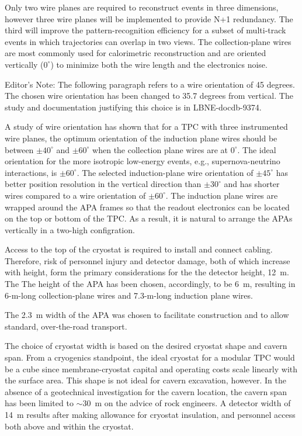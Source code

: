 Only two wire planes are required to reconstruct events in three dimensions, however three wire planes will be implemented to provide N+1 redundancy. The third will improve the pattern-recognition efficiency for a subset of multi-track events in which trajectories can overlap in two views. The collection-plane wires are most commonly used for calorimetric reconstruction and are oriented vertically ($0^\circ$) to minimize both the wire length and the electronics noise.

\begin{editornote}
  Editor's Note:  The following paragraph refers to a wire orientation of 45 degrees.  The chosen wire orientation has been changed to 35.7 degrees from vertical.  The study and documentation justifying this choice is in LBNE-docdb-9374.
\end{editornote}


A study of wire orientation has shown that for a TPC with three instrumented wire planes, the optimum orientation of the induction plane wires should be between $\pm40^\circ$ and $\pm60^\circ$ when the collection plane wires are at $0^\circ$. The ideal orientation for the more isotropic low-energy events, e.g., 
supernova-neutrino interactions, is $\pm60^\circ$. The selected induction-plane wire orientation of $\pm45^\circ$ has better position resolution in the vertical direction than $\pm30^\circ$ and has shorter wires compared to a wire orientation of $\pm60^\circ$.  The induction plane wires are wrapped around the APA frames so that the readout electronics can be located on the top or bottom of the TPC. As a result, it is natural to arrange the APAs vertically in a two-high configration. 

  Access to the top of the cryostat is required to install and connect cabling. Therefore, risk of personnel injury and detector damage, both of which increase with height, form the primary considerations for the the detector height, 12~m. The  The height of the APA has been chosen, accordingly, to be 6~m, resulting in 6-m-long collection-plane wires and 7.3-m-long induction plane wires. 

The 2.3~m width of the APA was chosen to facilitate construction and to allow standard, over-the-road transport. 

The choice of cryostat width is based on the desired cryostat shape and cavern span. From a cryogenics standpoint, the ideal cryostat for a modular TPC would be a cube since membrane-cryostat capital and operating costs scale linearly with the surface area. This shape is not ideal for cavern excavation, however. In the absence of a geotechnical investigation for the cavern location, the cavern span has been limited to $\sim$30~m on the advice of rock engineers. A detector width of 14~m results after making allowance for cryostat insulation, and personnel access both above and within the cryostat. 

